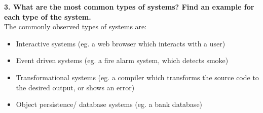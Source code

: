 \documentclass[12pt,letterpaper,titlepage,en-US]{article}
\begin{document}
 \textbf{3.	What are the most common types of systems? Find an example for each type of the system.}\\
  The commonly observed types of systems are:
  \begin{itemize}[noitemsep,nolistsep]
  \item Interactive systems (eg. a web browser which interacts with a user)
  \item Event driven systems (eg. a fire alarm system, which detects smoke)
  \item Transformational systems (eg. a compiler which transforms the source code to the desired output, or shows an error)
  \item Object persistence/ database systems (eg. a bank database)
  \end{itemize}
  
  
  
\end{document}
